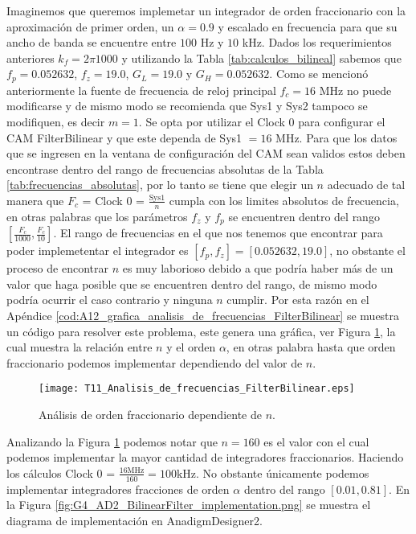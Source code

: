 Imaginemos que queremos implemetar un integrador de orden fraccionario con la aproximación de primer orden, un $\alpha = 0.9$ y escalado en frecuencia para que su ancho de banda se encuentre entre $100$ Hz y $10$ kHz. Dados los requerimientos anteriores $k_{f} = 2 \pi 1000$ y utilizando la Tabla \ref{tab:calculos_bilineal} sabemos que $f_{p} = 0.052632$, $f_{z} = 19.0$, $G_{L} = 19.0$ y $G_{H} = 0.052632$. Como se mencionó anteriormente la fuente de frecuencia de reloj principal $f_{c} = 16$ MHz no puede modificarse y de mismo modo se recomienda que Sys1 y Sys2 tampoco se modifiquen, es decir $m = 1$. Se opta por utilizar el Clock 0 para configurar el CAM FilterBilinear y que este dependa de Sys1 $=16$ MHz. Para que los datos que se ingresen en la ventana de configuración del CAM sean validos estos deben encontrase dentro del rango de frecuencias absolutas de la Tabla \ref{tab:frecuencias_absolutas}, por lo tanto se tiene que elegir un $n$ adecuado de tal manera que $F_{c}$ = Clock 0 = $\frac{\mathrm{Sys1}}{n}$ cumpla con los limites absolutos de frecuencia, en otras palabras que los parámetros $f_{z}$ y $f_{p}$ se encuentren dentro del rango $[\frac{F_{c}}{1000}, \frac{F_{c}}{10}]$. El rango de frecuencias en el que nos tenemos que encontrar para poder implemetentar el integrador es $[f_{p},f_{z}] = [0.052632, 19.0]$, no obstante el proceso de encontrar $n$ es muy laborioso debido a que podría haber más de un valor que haga posible que se encuentren dentro del rango, de mismo modo podría ocurrir el caso contrario y ninguna $n$ cumplir. Por esta razón en el Apéndice \ref{cod:A12_grafica_analisis_de_frecuencias_FilterBilinear} se muestra un código para resolver este problema, este genera una gráfica, ver Figura \ref{fig:T11_Analisis_de_frecuencias_FilterBilinear.eps}, la cual muestra la relación entre $n$ y el orden $\alpha$, en otras palabra hasta que orden fraccionario podemos implementar dependiendo del valor de $n$.

\begin{figure}[hbtp]
\caption{Análisis de orden fraccionario dependiente de $n$.} 
\label{fig:T11_Analisis_de_frecuencias_FilterBilinear.eps}
\centering
\texttt{[image: T11\_Analisis\_de\_frecuencias\_FilterBilinear.eps]}
\end{figure}

Analizando la Figura \ref{fig:T11_Analisis_de_frecuencias_FilterBilinear.eps} podemos notar que $n = 160$ es el valor con el cual podemos implementar la mayor cantidad de integradores fraccionarios. Haciendo los cálculos Clock 0 = $\frac{16 \mathrm{MHz}}{160} = 100 \mathrm{kHz}$. No obstante únicamente podemos implementar integradores fracciones de orden $\alpha$ dentro del rango $[0.01, 0.81]$. En la Figura \ref{fig:G4_AD2_BilinearFilter_implementation.png} se muestra el diagrama de implementación en AnadigmDesigner2.

